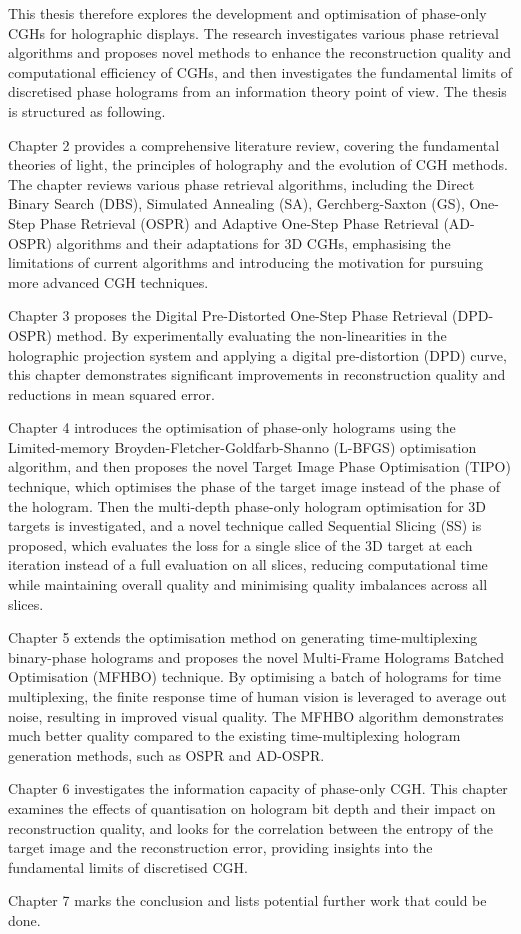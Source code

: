 This thesis therefore explores the development and optimisation of phase-only CGHs for holographic displays. The research investigates various phase retrieval algorithms and proposes novel methods to enhance the reconstruction quality and computational efficiency of CGHs, and then investigates the fundamental limits of discretised phase holograms from an information theory point of view. The thesis is structured as following.

Chapter 2 provides a comprehensive literature review, covering the fundamental theories of light, the principles of holography and the evolution of CGH methods. The chapter reviews various phase retrieval algorithms, including the Direct Binary Search (DBS), Simulated Annealing (SA), Gerchberg-Saxton (GS), One-Step Phase Retrieval (OSPR) and Adaptive One-Step Phase Retrieval (AD-OSPR) algorithms and their adaptations for 3D CGHs, emphasising the limitations of current algorithms and introducing the motivation for pursuing more advanced CGH techniques.

Chapter 3 proposes the Digital Pre-Distorted One-Step Phase Retrieval (DPD-OSPR) method. By experimentally evaluating the non-linearities in the holographic projection system and applying a digital pre-distortion (DPD) curve, this chapter demonstrates significant improvements in reconstruction quality and reductions in mean squared error.

Chapter 4 introduces the optimisation of phase-only holograms using the Limited-memory Broyden-Fletcher-Goldfarb-Shanno (L-BFGS) optimisation algorithm, and then proposes the novel Target Image Phase Optimisation (TIPO) technique, which optimises the phase of the target image instead of the phase of the hologram. Then the multi-depth phase-only hologram optimisation for 3D targets is investigated, and a novel technique called Sequential Slicing (SS) is proposed, which evaluates the loss for a single slice of the 3D target at each iteration instead of a full evaluation on all slices, reducing computational time while maintaining overall quality and minimising quality imbalances across all slices.

Chapter 5 extends the optimisation method on generating time-multiplexing binary-phase holograms and proposes the novel Multi-Frame Holograms Batched Optimisation (MFHBO) technique. By optimising a batch of holograms for time multiplexing, the finite response time of human vision is leveraged to average out noise, resulting in improved visual quality. The MFHBO algorithm demonstrates much better quality compared to the existing time-multiplexing hologram generation methods, such as OSPR and AD-OSPR.

Chapter 6 investigates the information capacity of phase-only CGH. This chapter examines the effects of quantisation on hologram bit depth and their impact on reconstruction quality, and looks for the correlation between the entropy of the target image and the reconstruction error, providing insights into the fundamental limits of discretised CGH.

Chapter 7 marks the conclusion and lists potential further work that could be done.

